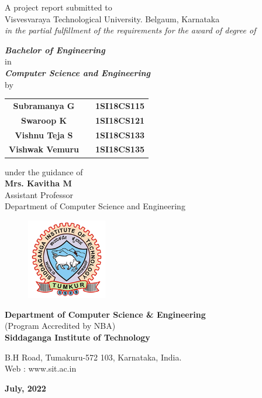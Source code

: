 \begin{titlingpage}
\begin{small}
A project report submitted to \\Visvesvaraya Technological University. Belgaum, Karnataka \\
\textit{in the partial fulfillment of the requirements for the award of degree of} \\
\end{small}
\begin{normalsize}
\textbf{\textit{Bachelor of Engineering }} \\
in \\
\textbf{\textit{Computer Science and Engineering}} \\
by \\
\end{normalsize}
\vfill
\begin{tabular}{ccc}
\Large{\textbf{Subramanya G}}&  & \Large{\textbf{1SI18CS115}}\\
\Large{\textbf{Swaroop K}}&  & \Large{\textbf{1SI18CS121}}\\
\Large{\textbf{Vishnu Teja S}}&  & \Large{\textbf{1SI18CS133}}\\
\Large{\textbf{Vishwak Vemuru}}&  & \Large{\textbf{1SI18CS135}}\\
\end{tabular}
\vfill

{\normalsize under the guidance of}\\
\Large{\textbf{Mrs. Kavitha M}}\\
Assistant Professor\\
Department of Computer Science and Engineering
\vfill
\begin{figure}[h]
    \centering
    \includegraphics[height=3.5cm]{images/sit.png}
\end{figure}

\textbf{Department of Computer Science \& Engineering}\\
{\normalsize (Program Accredited by NBA)} \\
\textbf{Siddaganga Institute of Technology}\\

\begin{normalsize}
B.H Road, Tumakuru-572 103, Karnataka, India.\\
Web : www.sit.ac.in \\
\end{normalsize}

\textbf{July, 2022}
\end{titlingpage}

